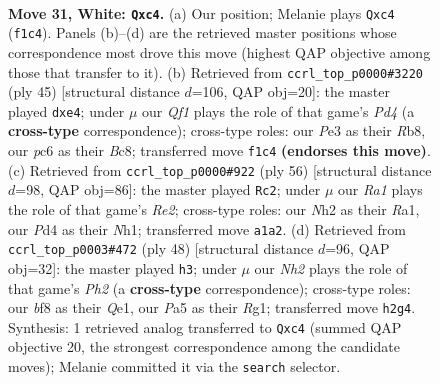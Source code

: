 \documentclass[11pt]{article}
\begin{document}
\clearpage

\begin{figure}[p]\centering
\begin{subfigure}{0.46\textwidth}\centering
\resizebox{\linewidth}{!}{%
\newchessgame
\chessboard[
  setfen={rk3b2/pp4pr/2p1b2p/P2p1p2/2qP3P/2B1P3/1PK2PPN/R4Q1R w - - 13 31},
  showmover=false,
  pgfstyle=straightmove, color=movearrow, markmove={f1-c4}
]}
\caption{}
\end{subfigure}\hfill
\begin{subfigure}{0.46\textwidth}\centering
\resizebox{\linewidth}{!}{%
\newchessgame
\chessboard[
  setfen={1rb1r1k1/5pp1/pp2q2p/3pP3/PQp1P3/2P3P1/2B2PP1/R3R1K1 b - - 0 23},
  showmover=false,
  pgfstyle=straightmove, color=movearrow, markmove={d5-e4}
]}
\caption{}
\end{subfigure}
\\[4pt]
\begin{subfigure}{0.46\textwidth}\centering
\resizebox{\linewidth}{!}{%
\newchessgame
\chessboard[
  setfen={5r2/1pp2rbk/3p3p/3Pp1p1/pPP1p2q/4P2P/P3R1PK/R3Q2N w - - 1 29},
  showmover=false,
  pgfstyle=straightmove, color=movearrow, markmove={e2-c2}
]}
\caption{}
\end{subfigure}\hfill
\begin{subfigure}{0.46\textwidth}\centering
\resizebox{\linewidth}{!}{%
\newchessgame
\chessboard[
  setfen={r5k1/3r1pp1/1q5p/pp1P1b2/2pRp3/P3P3/1P1B1PPP/4Q1RK w - - 4 25},
  showmover=false,
  pgfstyle=straightmove, color=movearrow, markmove={h2-h3}
]}
\caption{}
\end{subfigure}
\caption{\textbf{Move 31, White: \texttt{Qxc4}.} (a) Our position; Melanie plays \texttt{Qxc4} (\texttt{f1c4}). Panels (b)--(d) are the retrieved master positions whose correspondence most drove this move (highest QAP objective among those that transfer to it). (b) Retrieved from \texttt{ccrl\_top\_p0000\#3220} (ply 45) [structural distance $d$=106, QAP obj=20]: the master played \texttt{dxe4}; under $\mu$ our \emph{Qf1} plays the role of that game's \emph{Pd4} (a \textbf{cross-type} correspondence); cross-type roles: our \emph{P}e3 as their \emph{R}b8, our \emph{p}c6 as their \emph{B}c8; transferred move \texttt{f1c4} \textbf{(endorses this move)}. (c) Retrieved from \texttt{ccrl\_top\_p0000\#922} (ply 56) [structural distance $d$=98, QAP obj=86]: the master played \texttt{Rc2}; under $\mu$ our \emph{Ra1} plays the role of that game's \emph{Re2}; cross-type roles: our \emph{N}h2 as their \emph{R}a1, our \emph{P}d4 as their \emph{N}h1; transferred move \texttt{a1a2}. (d) Retrieved from \texttt{ccrl\_top\_p0003\#472} (ply 48) [structural distance $d$=96, QAP obj=32]: the master played \texttt{h3}; under $\mu$ our \emph{Nh2} plays the role of that game's \emph{Ph2} (a \textbf{cross-type} correspondence); cross-type roles: our \emph{b}f8 as their \emph{Q}e1, our \emph{P}a5 as their \emph{R}g1; transferred move \texttt{h2g4}. Synthesis: 1 retrieved analog transferred to \texttt{Qxc4} (summed QAP objective 20, the strongest correspondence among the candidate moves); Melanie committed it via the \texttt{search} selector.}
\label{fig:thought-m60}
\end{figure}
\end{document}

